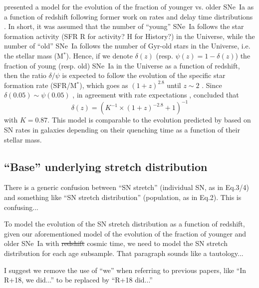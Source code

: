 \documentclass[]{aa} %
\newcommand{\yc}[1]{{\textcolor{BrickRed}{#1}}}
\begin{document}
\cite{rigault2018} presented a model for the evolution of the fraction of
younger vs. older SNe~Ia as a function of redshift following former work on
rates and delay time distributions \citep[e.g.,][]{mannucci2005,
scannapieco2005, sullivan2006, aubourg2008, childress2014, maozmannucci2014}.
In short, it was assumed that the number of \yc{``young''} SNe~Ia follows the star
formation activity (SFR \yc{R for activity? H for History?}) in the Universe, while the number of \yc{``old''} SNe~Ia
follows the number of Gyr-old stars in the Universe, i.e. the stellar mass
(M$^*$). Hence, if we denote $\delta(z)$ (resp. $\psi(z) = 1-\delta(z)$) the
fraction of young (resp. old) SNe~Ia in the Universe as a function of redshift,
then the ratio $\delta/\psi$ is expected to follow the evolution of the
specific star formation rate (SFR/M$^*$), which goes as $(1+z)^{2.8}$ until
$z\sim2$ \citep[e.g.,][]{tasca2015}. Since $\delta(0.05) \sim \psi(0.05)$
\citep{rigault2013,rigault2018,wiseman2020}, in agreement with rate expectations
\citep{mannucci2006,rodney2014}, \cite{rigault2018} concluded that
\begin{equation}
    \label{eq:delta}
    \delta(z) = \left( K^{-1} \times (1+z)^{-2.8} +1 \right)^{-1}
\end{equation}
with $K=0.87$. This model is comparable to the evolution predicted by
\cite{childress2014} based on SN rates in galaxies depending on their quenching
time as a function of their stellar mass.

\subsection{``Base'' underlying stretch distribution}
\label{sec:basemodel}

\yc{There is a generic confusion between ``SN stretch'' (individual SN, as in Eq.3/4) and something like ``SN stretch distribution'' (population, as in Eq.2). This is confusing...}

To model the evolution of the SN stretch \yc{distribution} as a function of redshift, given our
aforementioned model of the evolution of the fraction of younger and older
SNe~Ia with \yc{\sout{redshift} cosmic time}, we need to model the SN stretch distribution for each age
subsample. \yc{That paragraph sounds like a tautology...}

\yc{I suggest we remove the use of ``we'' when referring to previous papers, like ``In R+18, we did...'' to be replaced by ``R+18 did...''} 
\end{document}
